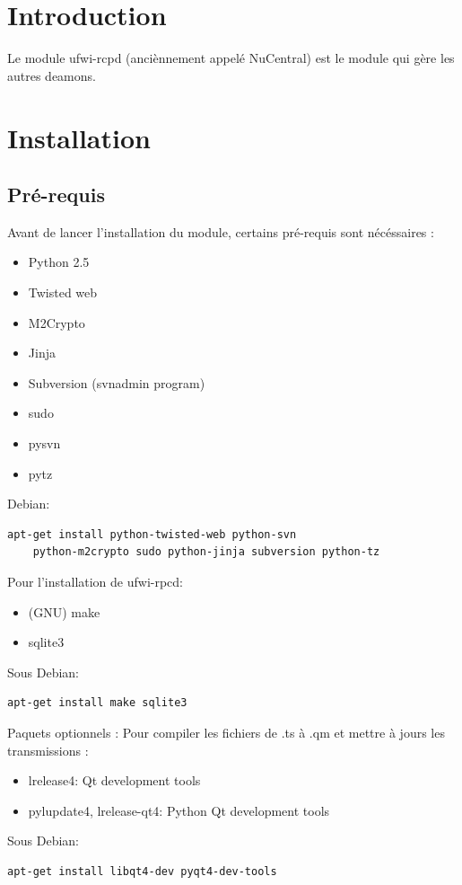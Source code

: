 \documentclass[12pt]{report}
\begin{document}
\begin{itemize}
\section{Introduction}
Le module ufwi-rcpd (anciènnement appelé NuCentral) est le module qui gère les autres deamons.

\section{Installation}
\subsection{Pré-requis}
Avant de lancer l'installation du module, certains pré-requis sont nécéssaires :
\begin{itemize}
  \item Python 2.5
  \item Twisted web
  \item M2Crypto
  \item Jinja
  \item Subversion (svnadmin program)
  \item sudo
  \item pysvn
  \item pytz
\end{itemize}
Debian: \begin{verbatim}apt-get install python-twisted-web python-svn 
    python-m2crypto sudo python-jinja subversion python-tz\end{verbatim}
\newline

Pour l'installation de ufwi-rpcd:
\begin{itemize}
  \item (GNU) make
  \item sqlite3
\end{itemize}
Sous Debian: \begin{verbatim}apt-get install make sqlite3\end{verbatim}
\newline

Paquets optionnels :
Pour compiler les fichiers de .ts à .qm et mettre à jours les transmissions :
\begin{itemize}
  \item lrelease4: Qt development tools
  \item pylupdate4, lrelease-qt4: Python Qt development tools
\end{itemize}
Sous Debian: \begin{verbatim}apt-get install libqt4-dev pyqt4-dev-tools\end{verbatim}
\newline


\end{itemize}
\end{document}
